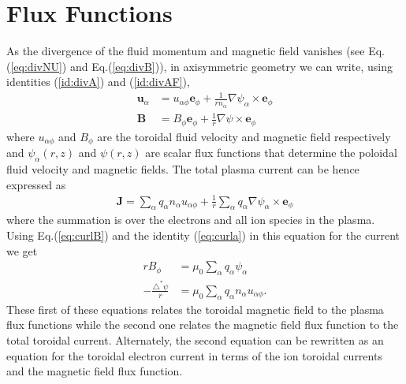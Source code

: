 \documentclass[11pt, reqno]{amsart}
\newcommand{\eqr}[1]{Eq.\thinspace(#1)}
\newcommand{\mvec}[1]{\mathbf{#1}}
\newcommand{\eep}{\mvec{e}_\phi}
\theoremstyle{definition}
\begin{document}
\section{Flux Functions}

As the divergence of the fluid momentum and magnetic field vanishes
(see \eqr{\ref{eq:divNU}} and \eqr{\ref{eq:divB}}), in axisymmetric
geometry we can write, using identities (\ref{id:divA}) and
(\ref{id:divAF}),
\begin{align}
  \mvec{u}_\alpha &= u_{\alpha \phi} \eep +
  \frac{1}{r n_\alpha}\nabla\psi_\alpha \times \eep \label{eq:uform} \\
  \mvec{B} &= B_{\phi} \eep +
  \frac{1}{r}\nabla\psi \times \eep \label{eq:bform}
\end{align}
where $u_{\alpha \phi}$ and $B_{\phi}$ are the toroidal fluid velocity
and magnetic field respectively and $\psi_\alpha(r,z)$ and $\psi(r,z)$
are scalar flux functions that determine the poloidal fluid velocity
and magnetic fields. The total plasma current can be hence expressed
as
\begin{align}
  \mvec{J} = \sum_\alpha q_\alpha n_\alpha u_{\alpha \phi}
  + \frac{1}{r}\sum_\alpha q_\alpha \nabla \psi_\alpha \times \eep
\end{align}
where the summation is over the electrons and all ion species in the
plasma. Using \eqr{\ref{eq:curlB}} and the identity (\ref{eq:curla})
in this equation for the current we get
\begin{align}
  rB_\phi &= \mu_0\sum_\alpha q_\alpha \psi_\alpha \\
  -\frac{\triangle^*\psi}{r} &=
  \mu_0 \sum_\alpha q_\alpha n_\alpha u_{\alpha \phi}.
  \label{eq:rBphi}
\end{align}
These first of these equations relates the toroidal magnetic field to
the plasma flux functions while the second one relates the magnetic
field flux function to the total toroidal current. Alternately, the
second equation can be rewritten as an equation for the toroidal
electron current in terms of the ion toroidal currents and the
magnetic field flux function.
\end{document}
